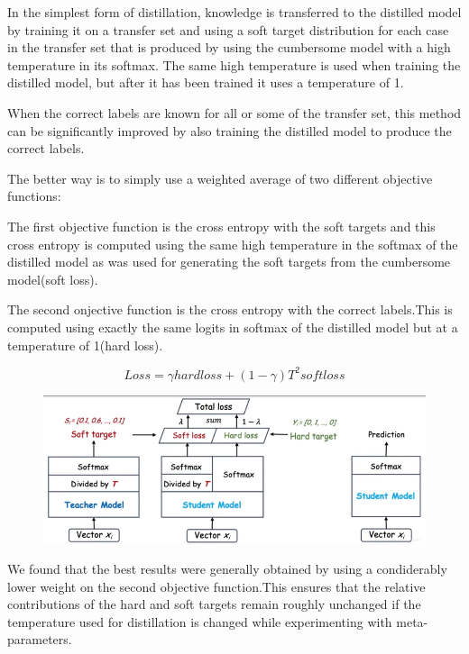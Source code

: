 \documentclass[11pt]{article}
\begin{document}
In the simplest form of distillation, knowledge is transferred to the distilled model by training it on a transfer set and using a soft target distribution for each case in the transfer set that is produced by using the cumbersome model with a high temperature in its softmax. The same high temperature is used when training the distilled model, but after it has been trained it uses a temperature of 1.

When the correct labels are known for all or some of the transfer set, this method can be significantly improved by also training the distilled model to produce the correct labels.

The better way is to simply use a weighted average of two different objective functions:

\noindent The first objective function is the cross entropy with the soft targets and this cross entropy is computed using the same high temperature in the softmax of the distilled model as was used for generating the soft targets from the cumbersome model(soft loss).

\noindent The second onjective function is the cross entropy with the correct labels.This is computed using exactly the same logits in softmax of the distilled model but at a temperature of 1(hard loss).

$$Loss = \gamma hardloss + (1 - \gamma)T^2 softloss$$

\begin{figure}[H]
	\centering
	\includegraphics[scale = 0.5]{91}
\end{figure}

We found that the best results were generally obtained by using a condiderably lower weight on the second objective function.This ensures that the relative contributions of the hard and soft targets remain roughly unchanged if the temperature used for distillation is changed while experimenting with meta-parameters.
\end{document}
